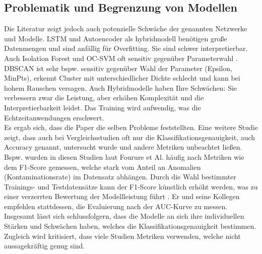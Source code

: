 \documentclass[a4paper,12pt]{article}
\begin{document}
	\subsection{Problematik und Begrenzung von Modellen}
	Die Literatur zeigt jedoch auch potenzielle Schwäche der genannten Netzwerke und Modelle. LSTM und Autoencoder als \gls{hybridmodell} benötigen große Datenmengen und sind anfällig für Overfitting. Sie sind schwer interpretierbar. Auch Isolation Forest und OC-SVM oft sensitiv gegenüber Parameterwahl \cite{chalapathy2019deep}.
	DBSCAN ist sehr bspw. sensitiv gegenüber Wahl der Parameter (Epsilon, MinPts), erkennt Cluster mit unterschiedlicher Dichte schlecht und kann bei hohem Rauschen versagen.
	Auch Hybridmodelle haben Ihre Schwächen: Sie verbessern zwar die Leistung, aber erhöhen Komplexität und die Interpretierbarkeit leidet. Das Training wird aufwendig, was die Echtzeitanwendungen erschwert.
	\\[0.5em]
	Es ergab sich, dass die Paper die selben Probleme feststellten. Eine weitere Studie zeigt, dass auch bei Vergleichsstudien oft nur die Klassifikationsgenauigkeit, auch Accuracy genannt, untersucht wurde und andere Metriken unbeachtet ließen. Bspw. wurden in diesen Studien laut Fourure et Al. häufig nach Metriken wie dem F1-Score gemessen, welche stark vom Anteil an Anomalien (Kontaminationsrate) im Datensatz abhängen. Durch die Wahl bestimmter Trainings- und Testdatensätze kann der F1-Score künstlich erhöht werden, was zu einer verzerrten Bewertung der Modellleistung führt \cite{fourure2021anomaly}. Er und seine Kollegen empfehlen stattdessen, die Evaluierung nach der AUC-Kurve zu messen.
	Insgesamt lässt sich schlussfolgern, dass die Modelle an sich ihre individuellen Stärken und Schwächen haben, welches die Klassifikationsgenauigkeit bestimmen. Zugleich wird kritisiert, dass viele Studien Metriken verwenden, welche nicht aussagekräftig genug sind.
	
\end{document}
